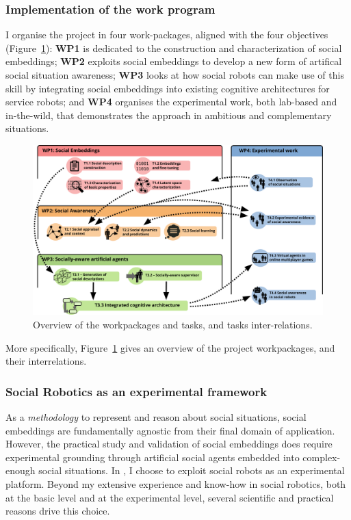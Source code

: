 \subsubsection{Implementation of the work program}

I organise the project in four work-packages, aligned with the four objectives
(Figure~\ref{fig:wps}): \textbf{WP1} is dedicated to the construction and
characterization of social embeddings; \textbf{WP2} exploits social embeddings
to develop a new form of artifical social situation awareness; \textbf{WP3} looks at how
social robots can make use of this skill by integrating social embeddings into
existing cognitive architectures for service robots; and \textbf{WP4} organises
the experimental work, both lab-based and in-the-wild, that demonstrates the
\project approach in ambitious and complementary situations.


\begin{figure}[h!]
\centering
\includegraphics[height=0.6\linewidth]{figs/wps}
\caption{Overview of the workpackages and tasks, and tasks inter-relations.}
\label{fig:wps}
\end{figure}

More specifically, Figure~\ref{fig:wps} gives an overview of the project
workpackages, and their interrelations.


\subsubsection{Social Robotics as an experimental framework}

As a \emph{methodology} to represent and reason about social situations, social
embeddings are fundamentally agnostic from their final domain of application.
However, the practical study and validation of social embeddings does require
experimental grounding through artificial social agents embedded into
complex-enough social situations. In \project, I choose to exploit social robots
as an experimental platform.  Beyond my extensive experience and know-how in
social robotics, both at the basic level and at the experimental level, several
scientific and practical reasons drive this choice.

